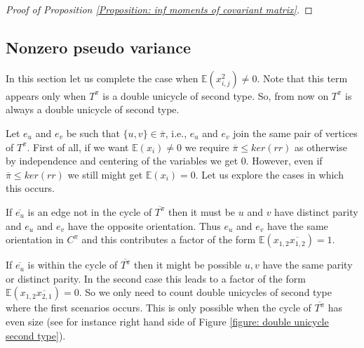 \documentclass{article}
\theoremstyle{definition}
\newcommand{\NC}{\mathcal{NC}}
\begin{document}
{\begin{proof}[Proof of Proposition \ref{Proposition: inf moments of covariant matrix}]

\end{proof}

\subsection{Nonzero pseudo variance}\label{Section: Case of non zero psudovariance}

In this section let us complete the case when $\mathbb{E}(x_{i,j}^2)\neq 0$. Note that this term appears only when $T^\pi$ is a double unicycle of second type. So, from now on $T^\pi$ is always a double unicycle of second type. 

Let $e_u$ and $e_v$ be such that $\{u,v\}\in \overline{\pi}$, i.e., $e_u$ and $e_v$ join the same pair of vertices of $T^\pi$. First of all, if we want $\mathbb{E}(x_i)\neq 0$ we require $\overline{\pi}\leq ker(rr)$ as otherwise by independence and centering of the variables we get $0$. However, even if $\overline{\pi}\leq ker(rr)$ we still might get $\mathbb{E}(x_i)=0$. Let us explore the cases in which this occurs.

If $\overline{e_u}$ is an edge not in the cycle of $\overline{T^\pi}$ then it must be $u$ and $v$ have distinct parity and $e_u$ and $e_v$ have the opposite orientation. Thus $e_u$ and $e_v$ have the same orientation in $C^\pi$ and this contributes a factor of the form $\mathbb{E}(x_{1,2}\overline{x_{1,2}})=1$. 

If $\overline{e_u}$ is within the cycle of $\overline{T^\pi}$ then it might be possible $u,v$ have the same parity or distinct parity. In the second case this leads to a factor of the form $\mathbb{E}(x_{1,2}\overline{x_{2,1}})=0$. So we only need to count double unicycles of second type where the first scenarios occurs. This is only possible when the cycle of $\overline{T^\pi}$ has even size (see for instance right hand side of Figure \ref{figure: double unicycle second type}).

}
\end{document}
